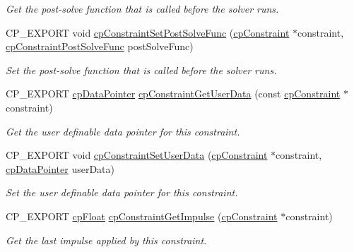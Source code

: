 \begin{DoxyCompactItemize}
\begin{DoxyCompactList}\small\item\em Get the post-\/solve function that is called before the solver runs. \end{DoxyCompactList}\item 
\mbox{\label{group__cp_constraint_ga37730c4854e0803955b1b29cafa005d6}} 
C\+P\+\_\+\+E\+X\+P\+O\+RT void \mbox{\hyperlink{group__cp_constraint_ga37730c4854e0803955b1b29cafa005d6}{cp\+Constraint\+Set\+Post\+Solve\+Func}} (\mbox{\hyperlink{structcp_constraint}{cp\+Constraint}} $\ast$constraint, \mbox{\hyperlink{group__cp_constraint_ga2208378297a7265d0cc69f31697961b9}{cp\+Constraint\+Post\+Solve\+Func}} post\+Solve\+Func)
\begin{DoxyCompactList}\small\item\em Set the post-\/solve function that is called before the solver runs. \end{DoxyCompactList}\item 
\mbox{\label{group__cp_constraint_gaf81f9f4d9d420c5746ad722c04c8388a}} 
C\+P\+\_\+\+E\+X\+P\+O\+RT \mbox{\hyperlink{group__basic_types_ga2ac2c3c31e21893941f9e4f8ee279447}{cp\+Data\+Pointer}} \mbox{\hyperlink{group__cp_constraint_gaf81f9f4d9d420c5746ad722c04c8388a}{cp\+Constraint\+Get\+User\+Data}} (const \mbox{\hyperlink{structcp_constraint}{cp\+Constraint}} $\ast$constraint)
\begin{DoxyCompactList}\small\item\em Get the user definable data pointer for this constraint. \end{DoxyCompactList}\item 
\mbox{\label{group__cp_constraint_ga3dc0f22f04eb955f16b11212a9e8b37f}} 
C\+P\+\_\+\+E\+X\+P\+O\+RT void \mbox{\hyperlink{group__cp_constraint_ga3dc0f22f04eb955f16b11212a9e8b37f}{cp\+Constraint\+Set\+User\+Data}} (\mbox{\hyperlink{structcp_constraint}{cp\+Constraint}} $\ast$constraint, \mbox{\hyperlink{group__basic_types_ga2ac2c3c31e21893941f9e4f8ee279447}{cp\+Data\+Pointer}} user\+Data)
\begin{DoxyCompactList}\small\item\em Set the user definable data pointer for this constraint. \end{DoxyCompactList}\item 
\mbox{\label{group__cp_constraint_ga742285346b076309fc021eed1af34483}} 
C\+P\+\_\+\+E\+X\+P\+O\+RT \mbox{\hyperlink{group__basic_types_gac1ed65573e035bf892505768c852d8d3}{cp\+Float}} \mbox{\hyperlink{group__cp_constraint_ga742285346b076309fc021eed1af34483}{cp\+Constraint\+Get\+Impulse}} (\mbox{\hyperlink{structcp_constraint}{cp\+Constraint}} $\ast$constraint)
\begin{DoxyCompactList}\small\item\em Get the last impulse applied by this constraint. \end{DoxyCompactList}\end{DoxyCompactItemize}


